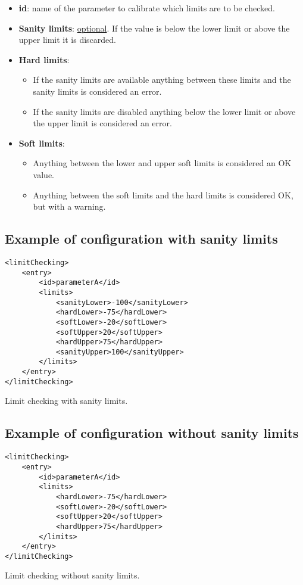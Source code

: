 \begin{itemize}
\item \textbf{id}: name of the parameter to calibrate which limits are to be checked.
\item \textbf{Sanity limits}: \underline{optional}. If the value is below the lower limit or above the upper limit it is discarded. 
\item \textbf{Hard limits}:
	\begin{itemize}
	\item If the sanity limits are available anything between these limits and the sanity limits is considered an error.
	\item If the sanity limits are disabled anything below the lower limit or above the upper limit is considered an error. 
	\end{itemize}
\item \textbf{Soft limits}: 
\begin{itemize}
\item Anything between the lower and upper soft limits is considered an OK value.
\item Anything between the soft limits and the hard limits is considered OK, but with a warning.
\end{itemize}
\end{itemize}

\subsection{Example of configuration with sanity limits}

\begin{table}[H]
\lstset{language=XML}
\begin{lstlisting}
<limitChecking>
	<entry>
		<id>parameterA</id>
		<limits>
			<sanityLower>-100</sanityLower>
			<hardLower>-75</hardLower>
			<softLower>-20</softLower>
			<softUpper>20</softUpper>
			<hardUpper>75</hardUpper>
			<sanityUpper>100</sanityUpper>
		</limits>
	</entry>
</limitChecking>
\end{lstlisting}
\caption{Limit checking with sanity limits.}
\label{Table5.12}
\end{table}

\subsection{Example of configuration without sanity limits}

\begin{table}[H]
\lstset{language=XML}
\begin{lstlisting}
<limitChecking>
	<entry>
		<id>parameterA</id>
		<limits>
			<hardLower>-75</hardLower>
			<softLower>-20</softLower>
			<softUpper>20</softUpper>
			<hardUpper>75</hardUpper>
		</limits>
	</entry>
</limitChecking>
\end{lstlisting}
\caption{Limit checking without sanity limits.}
\label{Table5.13}
\end{table}
